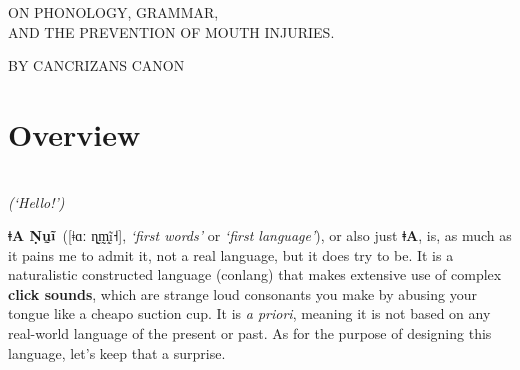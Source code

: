 \documentclass[11pt,a5paper]{book}
\newcommand{\qcn}[1]{\textcolor{AccentText}{\large\textbf{#1}}}
\newcommand{\langname}{\qcn{ǂA}}
\newcommand{\langnamelong}{\qcn{ǂA Ṇṵĩ}}
\begin{document}
\renewcommand{\arraystretch}{1.5}


\pagestyle{empty}




\begin{center}

	\Huge

	\vspace{0.4in}


	\vspace{0.2in}


	\vspace{1in}

	{\Large \textsc{ON PHONOLOGY, GRAMMAR,\\AND THE PREVENTION OF MOUTH INJURIES.}}

	\vfill

	{\Large \textsc{BY CANCRIZANS CANON}}

\end{center}


\pagebreak


\section{Overview}

\begin{center}
	\resizebox{1.5\width}{!}{\qcn{ǃUmǃoi!}}\\
\vspace{1em}
\emph{(`Hello!')}
\end{center}

\vspace{2em}

\langnamelong~([ǂɑː ɳ̰m̩̰ḭ̃˧], \emph{`first words'} or \emph{`first language'}), or also just \langname, is, as much as it pains me to admit it, not a real language, but it does try to be. It is a naturalistic constructed language (conlang) that makes extensive use of complex \textbf{click sounds}, which are strange loud consonants you make by abusing your tongue like a cheapo suction cup. It is \emph{a priori}, meaning it is not based on any real-world language of the present or past. As for the purpose of designing this language, let's keep that a surprise.
\end{document}
